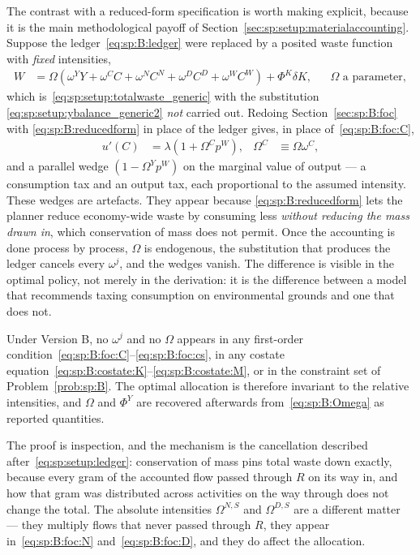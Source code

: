 The contrast with a reduced-form specification is worth making explicit, because it is the main
methodological payoff of Section~\ref{sec:sp:setup:materialaccounting}. Suppose the
ledger~\eqref{eq:sp:B:ledger} were replaced by a posited waste function with \emph{fixed} intensities,
\begin{align}
W &= \Omega\left(\omega^YY+\omega^CC+\omega^{N}C^N+\omega^{D}C^D+\omega^WC^W\right)+\Phi^K\delta K,
&&\Omega \text{ a parameter},
\label{eq:sp:B:reducedform}
\end{align}
which is~\eqref{eq:sp:setup:totalwaste_generic} with the substitution
\eqref{eq:sp:setup:ybalance_generic2} \emph{not} carried out. Redoing Section~\ref{sec:sp:B:foc} with
\eqref{eq:sp:B:reducedform} in place of the ledger gives, in place of~\eqref{eq:sp:B:foc:C},
\begin{align}
u'\!\left(C\right) &= \lambda\left(1+\Omega^Cp^W\right),
&
\Omega^C&\equiv\Omega\omega^C,
\label{eq:sp:B:spurious-C}
\end{align}
and a parallel wedge $\left(1-\Omega^Yp^W\right)$ on the marginal value of output --- a consumption tax
and an output tax, each proportional to the assumed intensity. These wedges are artefacts. They appear
because \eqref{eq:sp:B:reducedform} lets the planner reduce economy-wide waste by consuming less
\emph{without reducing the mass drawn in}, which conservation of mass does not permit. Once the
accounting is done process by process, $\Omega$ is endogenous, the substitution that produces the ledger
cancels every $\omega^j$, and the wedges vanish. The difference is visible in the optimal policy, not
merely in the derivation: it is the difference between a model that recommends taxing consumption on
environmental grounds and one that does not.

\begin{proposition}\label{prop:sp:B:irrelevance}
Under Version B, no $\omega^j$ and no $\Omega$ appears in any first-order
condition~\eqref{eq:sp:B:foc:C}--\eqref{eq:sp:B:foc:cs}, in any costate
equation~\eqref{eq:sp:B:costate:K}--\eqref{eq:sp:B:costate:M}, or in the constraint set of
Problem~\ref{prob:sp:B}. The optimal allocation is therefore invariant to the relative intensities, and
$\Omega$ and $\Phi^Y$ are recovered afterwards from~\eqref{eq:sp:B:Omega} as reported quantities.
\end{proposition}

The proof is inspection, and the mechanism is the cancellation described
after~\eqref{eq:sp:setup:ledger}: conservation of mass pins total waste down exactly, because every
gram of the accounted flow passed through $R$ on its way in, and how that gram was distributed across
activities on the way through does not change the total. The absolute intensities $\Omega^{N,S}$ and
$\Omega^{D,S}$ are a different matter --- they multiply flows that never passed through $R$, they
appear in~\eqref{eq:sp:B:foc:N} and~\eqref{eq:sp:B:foc:D}, and they do affect the allocation.

